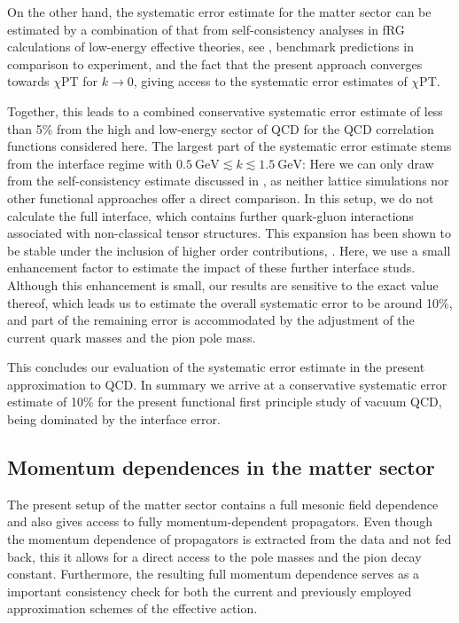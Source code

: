 \documentclass[aps,twocolumn,prd,superscriptaddress]{revtex4-2}
\begin{document}
On the other hand, the systematic error estimate for the matter sector can be estimated by a combination of that from self-consistency analyses in fRG calculations of low-energy effective theories, see \cite{Dupuis:2020fhh}, benchmark predictions in comparison to experiment, and the fact that the present approach converges towards $\chi$PT for $k\to 0$, giving access to the systematic error estimates of $\chi$PT. 

Together, this leads to a combined conservative systematic error estimate of less than 5\% from the high and low-energy sector of QCD for the QCD correlation functions considered here. The largest part of the systematic error estimate stems from the interface regime with $\qty{0.5}{\GeV} \lesssim k \lesssim \qty{1.5}{\GeV}$: Here we can only draw from the self-consistency estimate discussed in , as neither lattice simulations nor other functional approaches offer a direct comparison. 
In this setup, we do not calculate the full interface, which contains further quark-gluon interactions associated with non-classical tensor structures. This expansion has been shown to be stable under the inclusion of higher order contributions, \cite{Mitter:2014wpa, Braun:2014ata, Rennecke:2015eba, Cyrol:2017ewj}.
Here, we use a small enhancement factor to estimate the impact of these further interface studs. Although this enhancement is small, our results are sensitive to the exact value thereof, which leads us to estimate the overall systematic error to be around 10\%, and part of the remaining error is accommodated by the adjustment of the current quark masses and the pion pole mass. 

This concludes our evaluation of the systematic error estimate in the present approximation to QCD. In summary we arrive at a conservative systematic error estimate of 10\% for the present functional first principle study of vacuum QCD, being dominated by the interface error. 


\subsection{Momentum dependences in the matter sector}
\label{sec:ResultsMatterSector}

The present setup of the matter sector contains a full mesonic field dependence and also gives access to fully momentum-dependent propagators. Even though the momentum dependence of propagators is extracted from the data and not fed back, this it allows for a direct access to the pole masses and the pion decay constant. 
Furthermore, the resulting full momentum dependence serves as a important consistency check for both the current and previously employed approximation schemes of the effective action.
\end{document}
